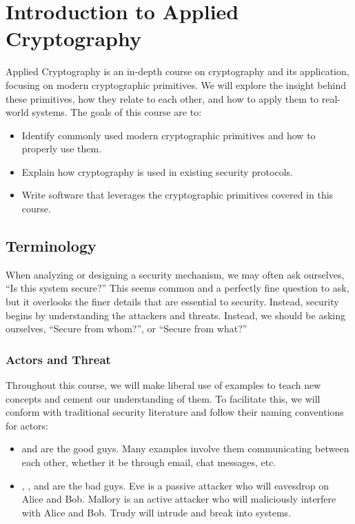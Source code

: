 \chapter{Introduction to Applied Cryptography}

Applied Cryptography is an in-depth course on cryptography and its application, focusing on modern cryptographic primitives. We will explore the insight behind these primitives, how they relate to each other, and how to apply them to real-world systems.
The goals of this course are to:
\begin{itemize}
    \item Identify commonly used modern cryptographic primitives and how to properly use them.
    \item Explain how cryptography is used in existing security protocols.
    \item Write software that leverages the cryptographic primitives covered in this course.
\end{itemize}

\section{Terminology}
When analyzing or designing a security mechanism, we may often ask ourselves, ``Is this system secure?'' This seems common and a perfectly fine question to ask, but it overlooks the finer details that are essential to security. Instead, security begins by understanding the attackers and threats. Instead, we should be asking ourselves, ``Secure from whom?'', or ``Secure from what?''

\subsection{Actors and Threat}
Throughout this course, we will make liberal use of examples to teach new concepts and cement our understanding of them. To facilitate this, we will conform with traditional security literature and follow their naming conventions for actors:

\begin{itemize}
    \item {} and  are the good guys. Many examples involve them communicating between each other, whether it be through email, chat messages, etc.
    \item {}, , and  are the bad guys. Eve is a passive attacker who will eavesdrop on Alice and Bob. Mallory is an active attacker who will maliciously interfere with Alice and Bob. Trudy will intrude and break into systems.
\end{itemize}

